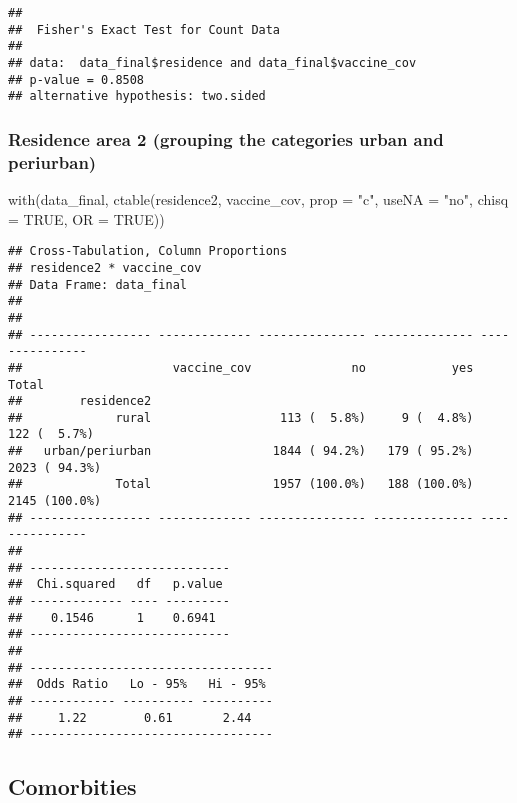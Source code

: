 \documentclass[
]{article}
\newenvironment{Shaded}{\begin{snugshade}}{\end{snugshade}}
\newcommand{\AttributeTok}[1]{\textcolor[rgb]{0.77,0.63,0.00}{#1}}
\newcommand{\ConstantTok}[1]{\textcolor[rgb]{0.00,0.00,0.00}{#1}}
\newcommand{\FunctionTok}[1]{\textcolor[rgb]{0.00,0.00,0.00}{#1}}
\newcommand{\NormalTok}[1]{#1}
\newcommand{\StringTok}[1]{\textcolor[rgb]{0.31,0.60,0.02}{#1}}
\begin{document}
\begin{verbatim}
## 
##  Fisher's Exact Test for Count Data
## 
## data:  data_final$residence and data_final$vaccine_cov
## p-value = 0.8508
## alternative hypothesis: two.sided
\end{verbatim}

\hypertarget{residence-area-2-grouping-the-categories-urban-and-periurban}{%
\subsubsection{Residence area 2 (grouping the categories urban and
periurban)}\label{residence-area-2-grouping-the-categories-urban-and-periurban}}

\begin{Shaded}
\begin{Highlighting}[]
\FunctionTok{with}\NormalTok{(data\_final, }\FunctionTok{ctable}\NormalTok{(residence2, vaccine\_cov, }\AttributeTok{prop =} \StringTok{"c"}\NormalTok{, }\AttributeTok{useNA =} \StringTok{"no"}\NormalTok{, }\AttributeTok{chisq =} \ConstantTok{TRUE}\NormalTok{, }\AttributeTok{OR =} \ConstantTok{TRUE}\NormalTok{))}
\end{Highlighting}
\end{Shaded}

\begin{verbatim}
## Cross-Tabulation, Column Proportions  
## residence2 * vaccine_cov  
## Data Frame: data_final  
## 
## 
## ----------------- ------------- --------------- -------------- ---------------
##                     vaccine_cov              no            yes           Total
##        residence2                                                             
##             rural                  113 (  5.8%)     9 (  4.8%)    122 (  5.7%)
##   urban/periurban                 1844 ( 94.2%)   179 ( 95.2%)   2023 ( 94.3%)
##             Total                 1957 (100.0%)   188 (100.0%)   2145 (100.0%)
## ----------------- ------------- --------------- -------------- ---------------
## 
## ----------------------------
##  Chi.squared   df   p.value 
## ------------- ---- ---------
##    0.1546      1    0.6941  
## ----------------------------
## 
## ----------------------------------
##  Odds Ratio   Lo - 95%   Hi - 95% 
## ------------ ---------- ----------
##     1.22        0.61       2.44   
## ----------------------------------
\end{verbatim}

\hypertarget{comorbities}{%
\subsection{Comorbities}\label{comorbities}}
\end{document}
